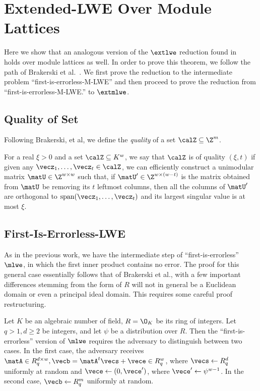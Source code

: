 \section{Extended-LWE Over Module Lattices}
\label{sec:extended-lwe-over}


Here we show that an analogous version of the $\extlwe$ reduction
found in~\cite{DBLP:conf/stoc/BrakerskiLPRS13} holds over module
lattices as well. In order to prove this theorem, we follow the
path of Brakerski et al.~\cite{DBLP:conf/stoc/BrakerskiLPRS13}.  We
first prove the reduction to the intermediate problem
``first-is-errorless-M-LWE'' and then proceed to prove the reduction
from ``first-is-errorless-M-LWE.'' to $\extmlwe$.

\subsection{Quality of Set}
\label{sec:set-quality}
Following Brakerski, et al, we define the \emph{quality} of a set
$\calZ \subseteq \Z^{m}$.

\begin{definition}\label{def:quality} For a real $\xi > 0$ and a set $\calZ \subseteq
  K^w$,
  we say that $\calZ$ is of \textnormal{quality} $(\xi,t)$ if given
  any $\vecz_1, \ldots, \vecz_t \in \calZ$, we can efficiently
  construct a unimodular matrix $\matU \in \Z^{w \times w}$ such that,
  if $\matU' \in \Z^{w \times (w-t)}$ is the matrix obtained from
  $\matU$ be removing its $t$ leftmost columns, then all the columns
  of $\matU'$ are orthogonal to $\text{span}(\vecz_1,\ldots,\vecz_t)$
  and its largest singular value is at most $\xi$.
\end{definition}


\subsection{First-Is-Errorless-LWE}
\label{sec:first-errorless-lwe}

As in the previous work, we have the intermediate step of
``first-is-errorless'' $\mlwe$, in which the first inner product
contains no error. The proof for this general case essentially follows
that of Brakerski et al., with a few important differences stemming
from the form of $R$ will not in general be a Euclidean domain or
even a principal ideal domain. This requires some careful proof
restructuring.
\begin{definition}\label{def:first-errorless-mlwe}
  Let $K$ be an algebraic number of field, $R=\O_{K}$ be its ring of
  integers. Let $q>1,d\geq 2$ be integers, and let $\psi$ be a
  distribution over $R$. Then the
  ``first-is-errorless'' version of $\mlwe$ requires the adversary to
  distinguish between two cases. In the first case, the adversary
  receives $\matA \in R_q^{d \times w},\vecb = \matA^t\vecs+\vece \in
  R_q^w$, where $\vecs \gets R_q^d$ uniformly at
  random and $\vece \gets (0, \vece')$, where $\vece' \gets
  \psi^{w-1}$.  In the second case, $\vecb \gets R_q^m$ uniformly at random.
\end{definition}

